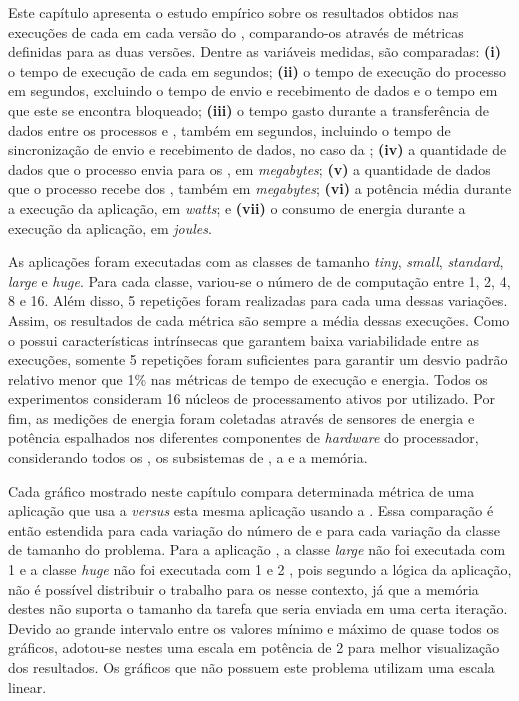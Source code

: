 Este capítulo apresenta o estudo empírico sobre os resultados obtidos nas execuções de cada  em cada versão do \capb, comparando-os através de métricas definidas para as duas versões. Dentre as variáveis medidas, são comparadas: \textbf{(i)} o tempo de execução de cada \CC em segundos; \textbf{(ii)} o tempo de execução do processo \master em segundos, excluindo o tempo de envio e recebimento de dados e o tempo em que este se encontra bloqueado; \textbf{(iii)} o tempo gasto durante a transferência de dados entre os processos \master e \slave, também em segundos, incluindo o tempo de sincronização de envio e recebimento de dados, no caso da \IPC; \textbf{(iv)} a quantidade de dados que o processo \master envia para os \slaves, em \textit{megabytes}; \textbf{(v)} a quantidade de dados que o processo \master recebe dos \slaves, também em \textit{megabytes}; \textbf{(vi)} a potência média durante a execução da aplicação, em \textit{watts}; e \textbf{(vii)} o consumo de energia durante a execução da aplicação, em \textit{joules}.

As aplicações foram executadas com as classes de tamanho \textit{tiny}, \textit{small}, \textit{standard}, \textit{large} e \textit{huge}. Para cada classe, variou-se o número de \clusters de computação entre 1, 2, 4, 8 e 16. Além disso, 5 repetições foram realizadas para cada uma dessas variações. Assim, os resultados de cada métrica são sempre a média dessas execuções. Como o \mppa possui características intrínsecas que garantem baixa variabilidade entre as execuções, somente 5 repetições foram suficientes para garantir um desvio padrão relativo menor que 1\% nas métricas de tempo de execução e energia. Todos os experimentos consideram 16 núcleos de processamento ativos por \cluster utilizado. Por fim, as medições de energia foram coletadas através de sensores de energia e potência espalhados nos diferentes componentes de \textit{hardware} do processador, considerando todos os \clusters, os subsistemas de \IO, a \NoC e a memória.

Cada gráfico mostrado neste capítulo compara determinada métrica de uma aplicação que usa a \API \ASYNC \textit{versus} esta mesma aplicação usando a \API \IPC. Essa comparação é então estendida para cada variação do número de \clusters e para cada variação da classe de tamanho do problema. Para a aplicação \KM, a classe \textit{large} não foi executada com 1 \cluster e a classe \textit{huge} não foi executada com 1 e 2 \clusters, pois segundo a lógica da aplicação, não é possível distribuir o trabalho para os \clusters nesse contexto, já que a memória destes não suporta o tamanho da tarefa que seria enviada em uma certa iteração. Devido ao grande intervalo entre os valores mínimo e máximo de quase todos os gráficos, adotou-se nestes uma escala em potência de 2 para melhor visualização dos resultados. Os gráficos que não possuem este problema utilizam uma escala linear.

